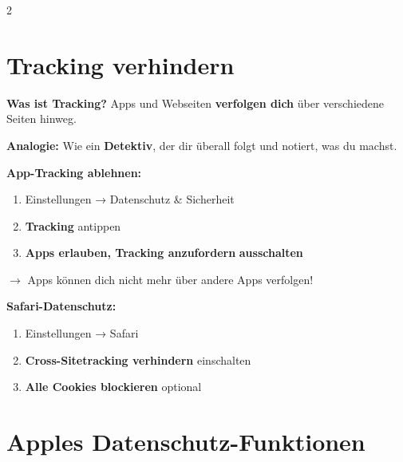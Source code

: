 \documentclass[a4paper,landscape,8pt]{extarticle}
\begin{document}
\begin{multicols}{2}
\begin{center}
\end{center}

\columnbreak

\section*{\textcolor{trackingred}{Tracking verhindern}}

\textbf{Was ist Tracking?} Apps und Webseiten \textbf{verfolgen dich} über verschiedene Seiten hinweg.

\textbf{Analogie:} Wie ein \textbf{Detektiv}, der dir überall folgt und notiert, was du machst.

\vspace{2mm}

\textbf{App-Tracking ablehnen:}
\begin{enumerate}
\item Einstellungen → Datenschutz \& Sicherheit
\item \textbf{Tracking} antippen
\item \textbf{\glqq Apps erlauben, Tracking anzufordern\grqq{}} \textbf{ausschalten}
\end{enumerate}

$\rightarrow$ Apps können dich nicht mehr über andere Apps verfolgen!

\vspace{2mm}

\textbf{Safari-Datenschutz:}
\begin{enumerate}
\item Einstellungen → Safari
\item \textbf{\glqq Cross-Sitetracking verhindern\grqq{}} einschalten
\item \textbf{\glqq Alle Cookies blockieren\grqq{}} optional
\end{enumerate}

\vspace{3mm}

\section*{\textcolor{appleblue}{Apples Datenschutz-Funktionen}}


\end{multicols}
\end{document}
